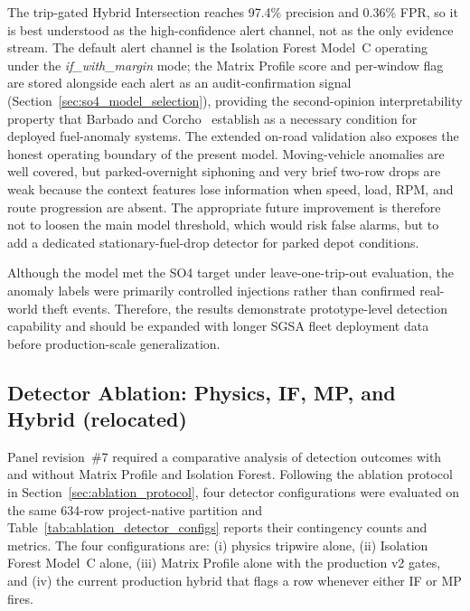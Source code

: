 The trip-gated Hybrid Intersection reaches 97.4\% precision and 0.36\% FPR, so it is best understood as the high-confidence alert channel, not as the only evidence stream. The default alert channel is the Isolation Forest Model~C operating under the \emph{if\_with\_margin} mode; the Matrix Profile score and per-window flag are stored alongside each alert as an audit-confirmation signal (Section~\ref{sec:so4_model_selection}), providing the second-opinion interpretability property that Barbado and Corcho~\cite{barbado2022interpretable} establish as a necessary condition for deployed fuel-anomaly systems. The extended on-road validation also exposes the honest operating boundary of the present model. Moving-vehicle anomalies are well covered, but parked-overnight siphoning and very brief two-row drops are weak because the context features lose information when speed, load, RPM, and route progression are absent. The appropriate future improvement is therefore not to loosen the main model threshold, which would risk false alarms, but to add a dedicated stationary-fuel-drop detector for parked depot conditions.

Although the model met the SO4 target under leave-one-trip-out evaluation, the anomaly labels were primarily controlled injections rather than confirmed real-world theft events. Therefore, the results demonstrate prototype-level detection capability and should be expanded with longer SGSA fleet deployment data before production-scale generalization.

\iffalse   %
\subsection{Detector Ablation: Physics, IF, MP, and Hybrid (relocated)}
\label{sec:so4_ablation_relocated}

Panel revision~\#7 required a comparative analysis of detection outcomes with and without Matrix Profile and Isolation Forest. Following the ablation protocol in Section~\ref{sec:ablation_protocol}, four detector configurations were evaluated on the same 634-row project-native partition and Table~\ref{tab:ablation_detector_configs} reports their contingency counts and metrics. The four configurations are: (i) physics tripwire alone, (ii) Isolation Forest Model~C alone, (iii) Matrix Profile alone with the production v2 gates, and (iv) the current production hybrid that flags a row whenever either IF or MP fires.


